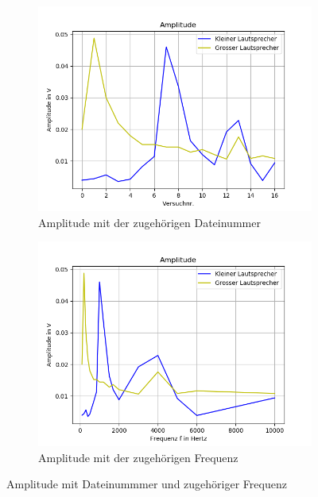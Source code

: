 \documentclass[12pt, oneside, a4paper, \docLanguage]{report}
\begin{document}
\begin{figure}[H]
\centering
\begin{subfigure}{.5\textwidth}
  \centering
  \includegraphics[width=0.9\linewidth]{../data/img/amplitudeanzahl.png}
  \caption{Amplitude mit der zugehörigen Dateinummer}
  \label{fig:Amplitude mit der zugehörigen Dateinummer}
\end{subfigure}%
\begin{subfigure}{.5\textwidth}
  \centering
  \includegraphics[width=0.9\linewidth]{../data/img/amplitudefrequenz.png}
  \caption{Amplitude mit der zugehörigen Frequenz}
  \label{fig:Amplitude mit der zugehörigen Frequenz}
\end{subfigure}
\caption{Amplitude mit Dateinummmer und zugehöriger Frequenz}
\label{fig:Amplitude mit Dateinummmer und zugehöriger Frequenz}
\end{figure}
\end{document}

